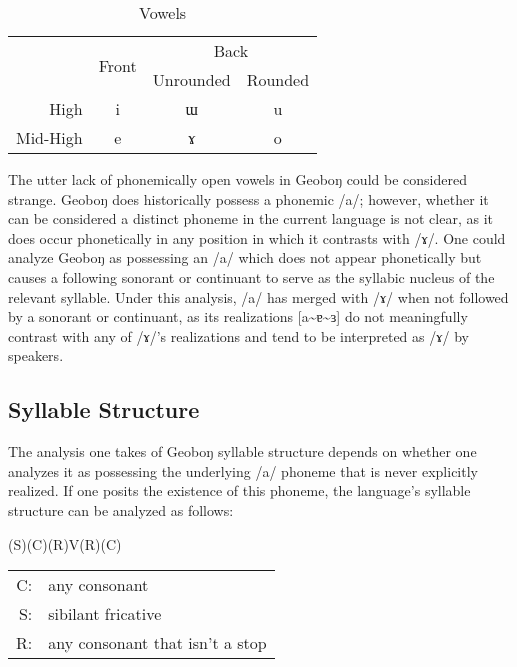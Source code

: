 \documentclass[10pt]{article}
\newcommand{\chris}[1]{{\Charis #1}}
\newcommand{\ipa}[1]{/\chris{#1}/}
\newcommand{\phipa}[1]{[\chris{#1}]}
\newcommand{\til}{\textasciitilde}
\newcommand{\engma}{ŋ}
\newcommand{\centra}{ɐ}
\newcommand{\centruh}{ɜ}
\newcommand{\unru}{ɯ}
\newcommand{\unro}{ɤ}
\begin{document}
\begin{table}[h]
    \centering
\begin{tabular}{@{}rccc@{}}
\toprule
\multicolumn{1}{l}{} & \multicolumn{1}{c}{\multirow{2}{*}{Front}} & \multicolumn{2}{c}{Back} \\
\multicolumn{1}{l}{} & \multicolumn{1}{c}{} & \multicolumn{1}{c}{Unrounded} & \multicolumn{1}{c}{Rounded} \\ \midrule
High & \chris{i} & \chris{\unru} & \chris{u} \\
Mid-High & \chris{e} & \chris{\unro} & \chris{o} \\ \bottomrule
\end{tabular}
    \caption{Vowels}
    \label{tab:vowels}
\end{table}

The utter lack of phonemically open vowels in Geobo{\engma} could be considered strange. Geobo{\engma} does historically possess a phonemic \ipa{a}; however, whether it can be considered a distinct phoneme in the current language is not clear, as it does occur phonetically in any position in which it contrasts with \ipa{\unro}. One could analyze Geobo{\engma} as possessing an \ipa{a} which does not appear phonetically but causes a following sonorant or continuant to serve as the syllabic nucleus of the relevant syllable. Under this analysis, \ipa{a} has merged with \ipa{\unro} when not followed by a sonorant or continuant, as its realizations \phipa{a\til\centra\til\centruh} do not meaningfully contrast with any of \ipa{\unro}'s realizations and tend to be interpreted as \ipa{\unro} by speakers.

\subsection{Syllable Structure}

The analysis one takes of Geobo{\engma} syllable structure depends on whether one analyzes it as possessing the underlying \ipa{a} phoneme that is never explicitly realized. If one posits the existence of this phoneme, the language's syllable structure can be analyzed as follows:

\begin{center}
    (S)(C)(R)V(R)(C)
    
    \begin{tabular}{rl}
         C: & any consonant \\
         S: & sibilant fricative  \\
         R: & any consonant that isn't a stop
    \end{tabular}
\end{center}
\end{document}
